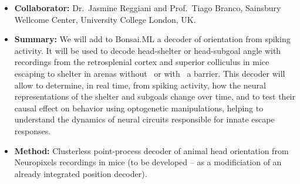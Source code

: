 
\begin{itemize}

    \item\textbf{Collaborator:} Dr.~Jasmine Reggiani and Prof.~Tiago Branco,
        Sainsbury Wellcome Center, University College London, UK.

    \item\textbf{Summary:} We will add to Bonsai.ML a decoder of orientation
        from spiking activity. It will be used to decode head-shelter or
        head-subgoal angle with recordings from the retrosplenial cortex and
        superior colliculus in mice escaping to shelter in arenas
        without~\citep{campagnerEtAl23} or with~\citep{shamashEtAl21} a
        barrier.
        This decoder will allow to determine, in real time, from spiking
        activity, how the neural representations of the shelter and subgoals
        change over time, and to test their causal effect on behavior using
        optogenetic manipulations, helping to understand the dynamics of neural
        circuits responsible for innate escape responses.

    \item\textbf{Method:} Clusterless point-process decoder of animal head
        orientation from Neuropixels recordings in mice (to be developed -- as
        a modificiation of an already integrated position decoder).

\end{itemize}



